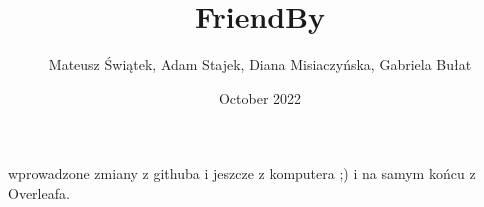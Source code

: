 \documentclass{article}
\title{FriendBy}
\author{Mateusz Świątek, Adam Stajek, Diana Misiaczyńska, Gabriela Bułat }
\date{October 2022}
\begin{document}
\maketitle

wprowadzone zmiany z githuba
i jeszcze z komputera ;)
i na samym końcu z Overleafa.






\end{document}

